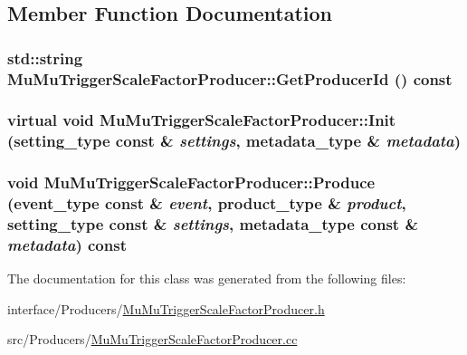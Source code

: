 \subsection{Member Function Documentation}
\hypertarget{classMuMuTriggerScaleFactorProducer_acd99ea5ee1f73fd6d3f27a357cc931bd}{
\subsubsection[{GetProducerId}]{\setlength{\rightskip}{0pt plus 5cm}std::string MuMuTriggerScaleFactorProducer::GetProducerId () const}}
\label{classMuMuTriggerScaleFactorProducer_acd99ea5ee1f73fd6d3f27a357cc931bd}
\hypertarget{classMuMuTriggerScaleFactorProducer_a27f1627a3f301b3ff208953eda6f3590}{
\subsubsection[{Init}]{\setlength{\rightskip}{0pt plus 5cm}virtual void MuMuTriggerScaleFactorProducer::Init (setting\_\-type const \& {\em settings}, \/  metadata\_\-type \& {\em metadata})}}
\label{classMuMuTriggerScaleFactorProducer_a27f1627a3f301b3ff208953eda6f3590}
\hypertarget{classMuMuTriggerScaleFactorProducer_acde0cb3f29fdd6e71f6cc2b434b2f079}{
\subsubsection[{Produce}]{\setlength{\rightskip}{0pt plus 5cm}void MuMuTriggerScaleFactorProducer::Produce (event\_\-type const \& {\em event}, \/  product\_\-type \& {\em product}, \/  setting\_\-type const \& {\em settings}, \/  metadata\_\-type const \& {\em metadata}) const}}
\label{classMuMuTriggerScaleFactorProducer_acde0cb3f29fdd6e71f6cc2b434b2f079}


The documentation for this class was generated from the following files:\begin{DoxyCompactItemize}
\item 
interface/Producers/\hyperlink{MuMuTriggerScaleFactorProducer_8h}{MuMuTriggerScaleFactorProducer.h}\item 
src/Producers/\hyperlink{MuMuTriggerScaleFactorProducer_8cc}{MuMuTriggerScaleFactorProducer.cc}\end{DoxyCompactItemize}
